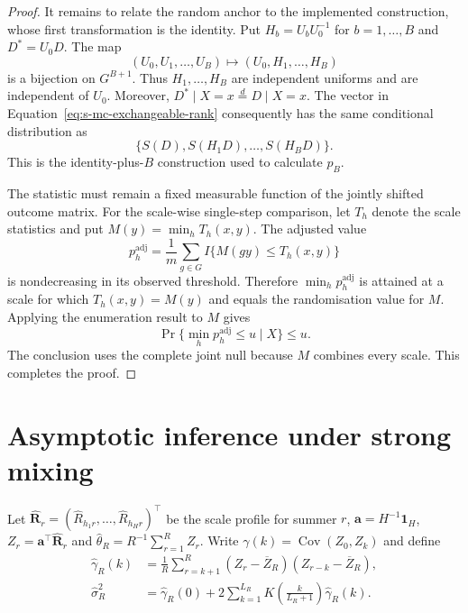 \documentclass[namedate,webpdf,modern,mediumone]{oup-authoring-template}
\theoremstyle{thmstyleone}
\begin{document}
\begin{proof}
It remains to relate the random anchor to the implemented construction, whose
first transformation is the identity. Put $H_b=U_bU_0^{-1}$ for
$b=1,\ldots,B$ and $D^*=U_0D$. The map
\[
 (U_0,U_1,\ldots,U_B)\longmapsto(U_0,H_1,\ldots,H_B)
\]
is a bijection on $G^{B+1}$. Thus $H_1,\ldots,H_B$ are independent uniforms
and are independent of $U_0$. Moreover,
$D^*\mid X=x\overset d=D\mid X=x$. The vector in
Equation~\eqref{eq:s-mc-exchangeable-rank} consequently has the same
conditional distribution as
\[
 \{S(D),S(H_1D),\ldots,S(H_BD)\}.
\]
This is the identity-plus-$B$ construction used to calculate $p_B$.

The statistic must remain a fixed measurable function of the jointly shifted
outcome matrix. For the scale-wise single-step comparison, let $T_h$ denote
the scale statistics and put $M(y)=\min_hT_h(x,y)$. The adjusted value
\[
 p_h^{\mathrm{adj}}=\frac{1}{m}\sum_{g\in G}
 I\{M(gy)\leq T_h(x,y)\}
\]
is nondecreasing in its observed threshold. Therefore
$\min_h p_h^{\mathrm{adj}}$ is attained at a scale for which
$T_h(x,y)=M(y)$ and equals the randomisation value for $M$. Applying the
enumeration result to $M$ gives
\[
 \Pr\{\min_h p_h^{\mathrm{adj}}\leq u\mid X\}\leq u.
\]
The conclusion uses the complete joint null because $M$ combines every
scale. This completes the proof.
\end{proof}

\section{Asymptotic inference under strong mixing}
\label{sec:process-proof}

Let
$\widehat{\boldsymbol R}_r=(\widehat R_{h_1r},\ldots,
\widehat R_{h_Hr})^\top$ be the scale profile for summer $r$,
$\boldsymbol a=H^{-1}\boldsymbol 1_H$,
$Z_r=\boldsymbol a^\top\widehat{\boldsymbol R}_r$ and
$\widehat\theta_R=R^{-1}\sum_{r=1}^RZ_r$. Write
$\gamma(k)=\operatorname{Cov}(Z_0,Z_k)$ and define
\begin{align}
 \widehat\gamma_R(k)
 &=\frac{1}{R}\sum_{r=k+1}^R
 (Z_r-\overline Z_R)(Z_{r-k}-\overline Z_R), \nonumber\\
 \widehat\sigma_R^2
 &=\widehat\gamma_R(0)+2\sum_{k=1}^{L_R}
 K\left(\frac{k}{L_R+1}\right)\widehat\gamma_R(k).
 \label{eq:s-hac-estimator}
\end{align}
\end{document}
